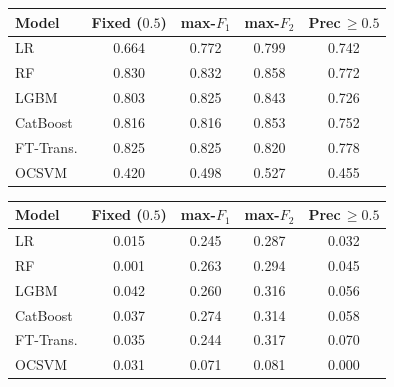 \documentclass[a4paper,fleqn]{cas-sc}
\begin{document}
\par\medskip\noindent\begin{minipage}{\linewidth}\centering
{}
\label{tab:threshold_ulb_f2}
\begin{tabular}{l c c c c}
\toprule
Model & Fixed ($0.5$) & max-$F_1$ & max-$F_2$ & Prec\,$\geq\!0.5$ \\
\midrule
LR         & 0.664 & 0.772 & 0.799 & 0.742 \\
RF         & 0.830 & 0.832 & 0.858 & 0.772 \\
LGBM       & 0.803 & 0.825 & 0.843 & 0.726 \\
CatBoost   & 0.816 & 0.816 & 0.853 & 0.752 \\
FT-Trans.  & 0.825 & 0.825 & 0.820 & 0.778 \\
OCSVM      & 0.420 & 0.498 & 0.527 & 0.455 \\
\bottomrule
\end{tabular}
\end{minipage}\par\medskip

\par\medskip\noindent\begin{minipage}{\linewidth}\centering
{}
\label{tab:threshold_baf_f2}
\begin{tabular}{l c c c c}
\toprule
Model & Fixed ($0.5$) & max-$F_1$ & max-$F_2$ & Prec\,$\geq\!0.5$ \\
\midrule
LR         & 0.015 & 0.245 & 0.287 & 0.032 \\
RF         & 0.001 & 0.263 & 0.294 & 0.045 \\
LGBM       & 0.042 & 0.260 & 0.316 & 0.056 \\
CatBoost   & 0.037 & 0.274 & 0.314 & 0.058 \\
FT-Trans.  & 0.035 & 0.244 & 0.317 & 0.070 \\
OCSVM      & 0.031 & 0.071 & 0.081 & 0.000 \\
\bottomrule
\end{tabular}
\end{minipage}\par\medskip
\end{document}
